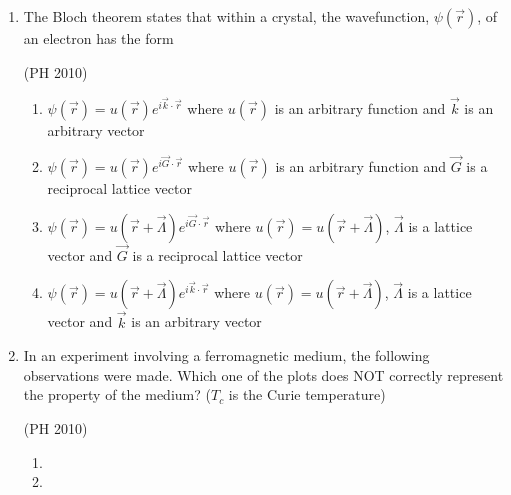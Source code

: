\documentclass[journal,12pt,onecolumn]{IEEEtran}
\theoremstyle{remark}
\begin{document}
\begin{enumerate}
\item The Bloch theorem states that within a crystal, the wavefunction, $\psi(\vec{r})$, of an electron has the form 

\hfill{(PH 2010)}

\begin{enumerate}
\item $\psi(\vec{r}) = u(\vec{r}) e^{i \vec{k} \cdot \vec{r}}$ where $u(\vec{r})$ is an arbitrary function and $\vec{k}$ is an arbitrary vector 
\item $\psi(\vec{r}) = u(\vec{r}) e^{i \vec{G} \cdot \vec{r}}$ where $u(\vec{r})$ is an arbitrary function and $\vec{G}$ is a reciprocal lattice vector 
\item $\psi(\vec{r}) = u(\vec{r} + \vec{\Lambda}) e^{i \vec{G} \cdot \vec{r}}$ where $u(\vec{r}) = u(\vec{r} + \vec{\Lambda})$, $\vec{\Lambda}$ is a lattice vector and $\vec{G}$ is a reciprocal lattice vector 
\item $\psi(\vec{r}) = u(\vec{r} + \vec{\Lambda}) e^{i \vec{k} \cdot \vec{r}}$ where $u(\vec{r}) = u(\vec{r} + \vec{\Lambda})$, $\vec{\Lambda}$ is a lattice vector and $\vec{k}$ is an arbitrary vector
\end{enumerate}


\item In an experiment involving a ferromagnetic medium, the following observations were made. Which one of the plots does NOT correctly represent the property of the medium? ($T_c$ is the Curie temperature) 

\hfill{(PH 2010)}
\begin{multicols}{2}
\begin{enumerate}

\item {}


\item 
  {}
\end{enumerate}
\end{multicols}
\end{enumerate}
\end{document}
